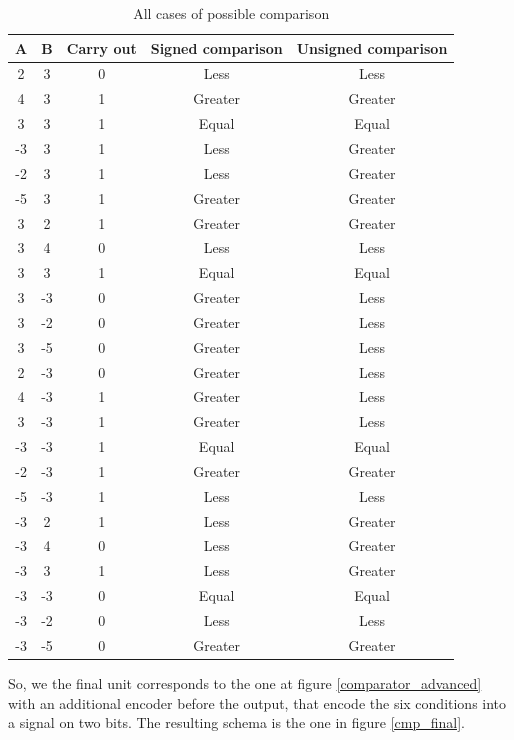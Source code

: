 \begin{table}[H]
  \centering
  \begin{tabular}{c|c|c|c|c}
      \textbf{A} & \textbf{B} & \textbf{Carry out} & \textbf{Signed comparison} & \textbf{Unsigned comparison} \\
      \hline
      2 & 3 & 0 & Less & Less \\
      4 & 3 & 1 & Greater & Greater \\
      3 & 3 & 1 & Equal & Equal \\
      \rowcolor{red!50}
      -3 & 3 & 1 & Less & Greater \\
      \rowcolor{red!50}
      -2 & 3 & 1 & Less & Greater \\
      \rowcolor{red!50}
      -5 & 3 & 1 & Greater & Greater \\
      \hline
      3 & 2 & 1 & Greater & Greater \\
      3 & 4 & 0 & Less & Less \\
      3 & 3 & 1 & Equal & Equal \\
      \rowcolor{red!50}
      3 & -3 & 0 & Greater & Less \\
      \rowcolor{red!50}
      3 & -2 & 0 & Greater & Less \\
      \rowcolor{red!50}
      3 & -5 & 0 & Greater & Less \\
      \hline
      \rowcolor{red!50}
      2 & -3 & 0 & Greater & Less \\
      \rowcolor{red!50}
      4 & -3 & 1 & Greater & Less \\
      \rowcolor{red!50}
      3 & -3 & 1 & Greater & Less \\
      -3 & -3 & 1 & Equal & Equal \\
      -2 & -3 & 1 & Greater & Greater \\
      -5 & -3 & 1 & Less & Less \\
      \hline
      \rowcolor{red!50}
      -3 & 2 & 1 & Less & Greater \\
      \rowcolor{red!50}
      -3 & 4 & 0 & Less & Greater \\
      \rowcolor{red!50}
      -3 & 3 & 1 & Less & Greater \\
      -3 & -3 & 0 & Equal & Equal \\
      -3 & -2 & 0 & Less & Less \\
      -3 & -5 & 0 & Greater & Greater \\
  \end{tabular}
  \caption{All cases of possible comparison}
  \label{comparator_cases}
\end{table}
So, we the final unit corresponds to the one at figure \ref{comparator_advanced} with an additional encoder before the output, that encode the six conditions into a signal on two bits. The resulting schema is the one in figure \ref{cmp_final}.

